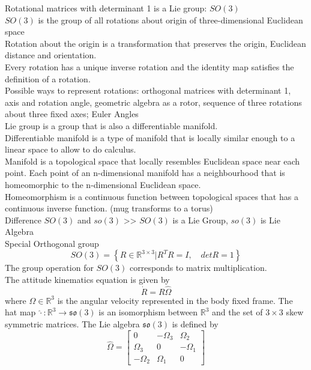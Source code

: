Rotational matrices with determinant 1 is a Lie group: $ SO(3) $\\
$ SO(3) $ is the group of all rotations about origin of three-dimensional Euclidean space\\
Rotation about the origin is a transformation that preserves the origin, Euclidean distance and orientation.\\
Every rotation has a unique inverse rotation and the identity map satisfies the definition of a rotation.\\
Possible ways to represent rotations: orthogonal matrices with determinant 1, axis and rotation angle, geometric algebra as a rotor, sequence of three rotations about three fixed axes; Euler Angles\\
Lie group is a group that is also a differentiable manifold.\\
Differentiable manifold is a type of manifold that is locally similar enough to a linear space to allow to do calculus.\\
Manifold is a topological space that locally resembles Euclidean space near each point. Each point of an n-dimensional manifold has a neighbourhood that is homeomorphic to the n-dimensional Euclidean space.\\
Homeomorphism is a continuous function between topological spaces that has a continuous inverse function. (mug transforms to a torus)\\


Difference $ SO(3) $ and $ so(3) $ >> $ SO(3) $ is a Lie Group, $ so(3) $ is Lie Algebra\\
Special Orthogonal group
\begin{equation}\label{key}
SO(3)=\left\lbrace R\in\mathbb{R}^{3\times3}|R^TR=I,\quad detR=1\right\rbrace 
\end{equation}
The group operation for $ SO(3) $ corresponds to matrix multiplication.\\
The attitude kinematics equation is given by
\begin{equation}\label{key}
\dot{R}=R\hat{\Omega}
\end{equation}
where $ \Omega\in\mathbb{R}^3 $ is the angular velocity represented in the body fixed frame. The hat map $ \hat{\cdot}:\mathbb{R}^3\rightarrow \mathfrak{so}(3)$ is an isomorphism between $ \mathbb{R}^3 $ and the set of $ 3\times 3 $ skew symmetric matrices. The Lie algebra $ \mathfrak{so}(3) $ is defined by
\begin{equation}\label{key}
\hat{\Omega}=\begin{bmatrix}
0&-\Omega_3&\Omega_2\\
\Omega_3&0&-\Omega_1\\
-\Omega_2&\Omega_1&0
\end{bmatrix}
\end{equation}

